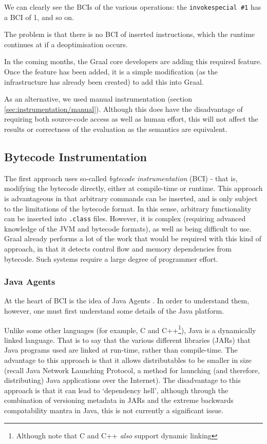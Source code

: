 	We can clearly see the BCIs of the various operations: the \texttt{invokespecial \#1} has a BCI of 1, and so on.
	
	The problem is that there is no BCI of inserted instructions, which the runtime continues at if a deoptimisation occurs.
	
	In the coming months, the Graal core developers are adding this required feature. Once the feature has been added, it is a simple modification (as the infrastructure has already been created) to add this into Graal.
	
	As an alternative, we used manual instrumentation (section \ref{sec:instrumentation/manual}). Although this does have the disadvantage of requiring both source-code access as well as human effort, this will not affect the results or correctness of the evaluation as the semantics are equivalent.

	\subsection{Bytecode Instrumentation} \label{sec:instrumentation/bytecode-instr}
	The first approach uses so-called \textit{bytecode instrumentation} (BCI) - that is, modifying the bytecode directly, either at compile-time or runtime. This approach is advantageous in that arbitrary commands can be inserted, and is only subject to the limitations of the bytecode format. In this sense, arbitrary functionality can be inserted into \texttt{.class} files. However, it is complex (requiring advanced knowledge of the JVM and bytecode formats), as well as being difficult to use. Graal already performs a lot of the work that would be required with this kind of approach, in that it detects control flow and memory dependencies from bytecode. Such systems require a large degree of programmer effort.

		\subsubsection{Java Agents} \label{sec:instrumentation/bytecode-instr/agents}
		At the heart of BCI is the idea of Java Agents \citep{javaagents}. In order to understand them, however, one must first understand some details of the Java platform.
		
		Unlike some other languages (for example, C and C++\footnote{Although note that C and C++ \emph{also} support dynamic linking}), Java is a dynamically linked language. That is to say that the various different libraries (JARs) that Java programs used are linked at run-time, rather than compile-time. The advantage to this approach is that it allows distributables to be smaller in size (recall Java Network Launching Protocol, a method for launching (and therefore, distributing) Java applications over the Internet). The disadvantage to this approach is that it can lead to `dependency hell', although through the combination of versioning metadata in JARs and the extreme backwards compatability mantra in Java, this is not currently a significant issue.
		
